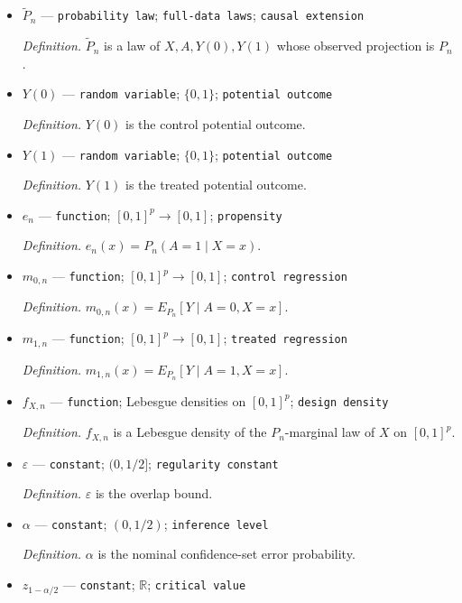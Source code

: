 \documentclass{article}
\begin{document}
\begin{itemize}
  \par\smallskip\noindent\emph{Definition.} \(P\) is an individual observed-data law with its row index suppressed.
  \item \(\widetilde P_n\) --- \texttt{probability law}; \texttt{full-\allowbreak{}data laws}; \texttt{causal extension}
  \par\smallskip\noindent\emph{Definition.} \(\widetilde P_n\) is a law of \(X,A,Y(0),Y(1)\) whose observed projection is \(P_n\).
  \item \(Y(0)\) --- \texttt{random variable}; \(\{0,1\}\); \texttt{potential outcome}
  \par\smallskip\noindent\emph{Definition.} \(Y(0)\) is the control potential outcome.
  \item \(Y(1)\) --- \texttt{random variable}; \(\{0,1\}\); \texttt{potential outcome}
  \par\smallskip\noindent\emph{Definition.} \(Y(1)\) is the treated potential outcome.
  \item \(e_n\) --- \texttt{function}; \([0,1]^p\to[0,1]\); \texttt{propensity}
  \par\smallskip\noindent\emph{Definition.} \(e_n(x)=P_n(A=1\mid X=x)\).
  \item \(m_{0,n}\) --- \texttt{function}; \([0,1]^p\to[0,1]\); \texttt{control regression}
  \par\smallskip\noindent\emph{Definition.} \(m_{0,n}(x)=E_{P_n}[Y\mid A=0,X=x]\).
  \item \(m_{1,n}\) --- \texttt{function}; \([0,1]^p\to[0,1]\); \texttt{treated regression}
  \par\smallskip\noindent\emph{Definition.} \(m_{1,n}(x)=E_{P_n}[Y\mid A=1,X=x]\).
  \item \(f_{X,n}\) --- \texttt{function}; Lebesgue densities on \([0,1]^p\); \texttt{design density}
  \par\smallskip\noindent\emph{Definition.} \(f_{X,n}\) is a Lebesgue density of the \(P_n\)-marginal law of \(X\) on \([0,1]^p\).
  \item \(\varepsilon\) --- \texttt{constant}; \((0,1/2]\); \texttt{regularity constant}
  \par\smallskip\noindent\emph{Definition.} \(\varepsilon\) is the overlap bound.
  \item \(\alpha\) --- \texttt{constant}; \((0,1/2)\); \texttt{inference level}
  \par\smallskip\noindent\emph{Definition.} \(\alpha\) is the nominal confidence-set error probability.
  \item \(z_{1-\alpha/2}\) --- \texttt{constant}; \(\mathbb R\); \texttt{critical value}

\end{itemize}
\end{document}
